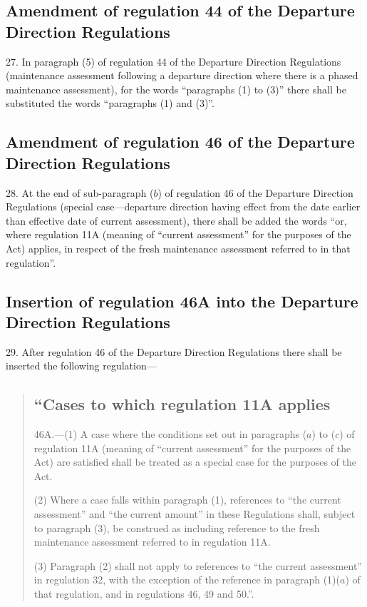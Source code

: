\documentclass[12pt,a4paper]{article}
\begin{document}
\subsection[27. Amendment of regulation 44 of the Departure Direction Regulations]{Amendment of regulation 44 of the Departure Direction Regulations}

27.  In paragraph (5) of regulation 44 of the Departure Direction Regulations (maintenance assessment following a departure direction where there is a phased maintenance assessment), for the words “paragraphs (1) to (3)” there shall be substituted the words “paragraphs (1) and (3)”.

\subsection[28. Amendment of regulation 46 of the Departure Direction Regulations]{Amendment of regulation 46 of the Departure Direction Regulations}

28.  At the end of sub-paragraph ($b$) of regulation 46 of the Departure Direction Regulations (special case—departure direction having effect from the date earlier than effective date of current assessment), there shall be added the words “or, where regulation 11A (meaning of “current assessment” for the purposes of the Act) applies, in respect of the fresh maintenance assessment referred to in that regulation”.

\subsection[29. Insertion of regulation 46A into the Departure Direction Regulations]{Insertion of regulation 46A into the Departure Direction Regulations}

29.  After regulation 46 of the Departure Direction Regulations there shall be inserted the following regulation—
\begin{quotation}
\subsection*{“Cases to which regulation 11A applies}

46A.—(1) A case where the conditions set out in paragraphs ($a$) to ($c$) of regulation 11A (meaning of “current assessment” for the purposes of the Act) are satisfied shall be treated as a special case for the purposes of the Act.

(2) Where a case falls within paragraph (1), references to “the current assessment” and “the current amount” in these Regulations shall, subject to paragraph (3), be construed as including reference to the fresh maintenance assessment referred to in regulation 11A.

(3) Paragraph (2) shall not apply to references to “the current assessment” in regulation 32, with the exception of the reference in paragraph (1)($a$) of that regulation, and in regulations 46, 49 and 50.”.
\end{quotation}
\end{document}
